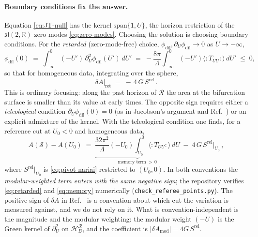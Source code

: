 \documentclass[11pt]{article}
\newcommand{\Srel}{S^{\mathrm{rel}}}
\begin{document}
\paragraph{Boundary conditions fix the answer.} Equation \eqref{eq:JT-null} has the kernel $\mathrm{span}\{1,U\}$, the horizon restriction of the $\mathfrak{sl}(2,\mathbb R)$ zero modes \eqref{eq:zero-modes}. Choosing the solution is choosing boundary conditions. For the \emph{retarded} (zero-mode-free) choice, $\phi_{\mathrm{dil}},\partial_U\phi_{\mathrm{dil}}\to0$ as $U\to-\infty$,
\begin{equation}
\phi_{\mathrm{dil}}(0) \;=\; \int_{-\infty}^{0}(-U')\,\partial_U^2\phi_{\mathrm{dil}}(U')\,dU' \;=\; -\frac{8\pi}{\Lambda}\int_{-\infty}^{0}(-U')\langle{:}T_{UU}{:}\rangle\,dU' \;\le\;0,
\label{eq:retarded}
\end{equation}
so that for homogeneous data, integrating over the sphere,
\begin{equation}
\delta A\big|_{\mathrm{ret}} \;=\; -\,4\,G\,\Srel\,.
\label{eq:JT-response}
\end{equation}
This is ordinary focusing: along the past horizon of $\mathcal R$ the area at the bifurcation surface is smaller than its value at early times. The opposite sign requires either a \emph{teleological} condition $\partial_U\phi_{\mathrm{dil}}(0)=0$ (as in Jacobson's argument and Ref.~\cite{DorauMuch}) or an explicit admixture of the kernel. With the teleological condition one finds, for a reference cut at $U_0<0$ and homogeneous data,
\begin{equation}
A(\mathcal S)-A(U_0) \;=\; \underbrace{\frac{32\pi^2}{\Lambda}(-U_0)\int_{U_0}^{0}\langle{:}T_{UU}{:}\rangle\,dU}_{\text{memory term}\;>\,0}\;-\;4\,G\,\Srel\big|_{U_0}\,,
\label{eq:memory}
\end{equation}
where $\Srel|_{U_0}$ is \eqref{eq:pivot-nariai} restricted to $(U_0,0)$. In both conventions the \emph{modular-weighted term enters with the same negative sign}; the repository verifies \eqref{eq:retarded} and \eqref{eq:memory} numerically (\texttt{check\_referee\_points.py}). The positive sign of $\delta A$ in Ref.~\cite{DorauMuch} is a convention about which cut the variation is measured against, and we do not rely on it. What is convention-independent is the magnitude and the modular weighting: the modular weight $(-U)$ is the Green kernel of $\partial_U^2$ on $\mathcal H_B^{\mathcal R}$, and the coefficient is $|\delta A_{\mathrm{mod}}|=4G\,\Srel$.
\end{document}
